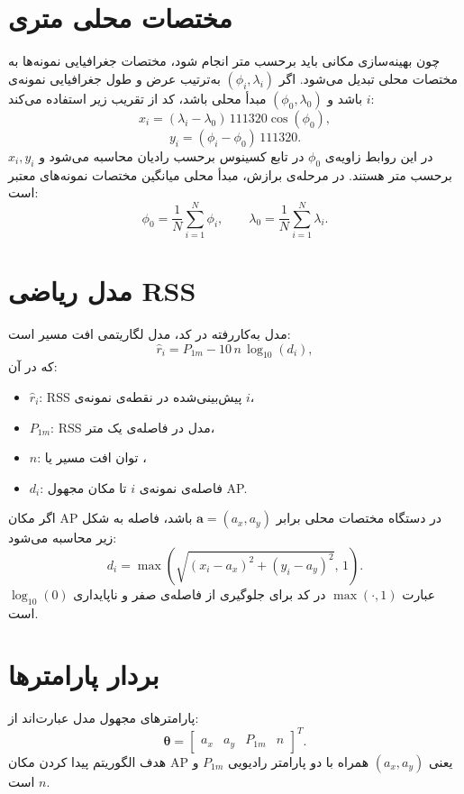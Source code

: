 \documentclass[12pt,a4paper]{article}
\begin{document}
\section{مختصات محلی متری}
چون بهینه‌سازی مکانی باید برحسب متر انجام شود، مختصات جغرافیایی نمونه‌ها به مختصات محلی تبدیل می‌شود. اگر
\((\phi_i,\lambda_i)\)
به‌ترتیب عرض و طول جغرافیایی نمونه‌ی
\(i\)
باشد و
\((\phi_0,\lambda_0)\)
مبدأ محلی باشد، کد از تقریب زیر استفاده می‌کند:
\[
x_i=(\lambda_i-\lambda_0)\,111320\cos(\phi_0),
\]
\[
y_i=(\phi_i-\phi_0)\,111320.
\]
در این روابط زاویه‌ی
\(\phi_0\)
در تابع کسینوس برحسب رادیان محاسبه می‌شود و
\(x_i,y_i\)
برحسب متر هستند. در مرحله‌ی برازش، مبدأ محلی میانگین مختصات نمونه‌های معتبر است:
\[
\phi_0=\frac{1}{N}\sum_{i=1}^{N}\phi_i,\qquad
\lambda_0=\frac{1}{N}\sum_{i=1}^{N}\lambda_i.
\]

\section{مدل ریاضی RSS}
مدل به‌کاررفته در کد، مدل لگاریتمی افت مسیر است:
\[
\hat r_i = P_{1m} - 10\,n\,\log_{10}(d_i),
\]
که در آن:
\begin{itemize}
  \item \(\hat r_i\): RSS پیش‌بینی‌شده در نقطه‌ی نمونه‌ی \(i\)،
  \item \(P_{1m}\): RSS مدل در فاصله‌ی یک متر،
  \item \(n\): توان افت مسیر یا ،
  \item \(d_i\): فاصله‌ی نمونه‌ی \(i\) تا مکان مجهول AP.
\end{itemize}
اگر مکان AP در دستگاه مختصات محلی برابر
\(\mathbf{a}=(a_x,a_y)\)
باشد، فاصله به شکل زیر محاسبه می‌شود:
\[
d_i=\max\left(\sqrt{(x_i-a_x)^2+(y_i-a_y)^2},\,1\right).
\]
عبارت
\(\max(\cdot,1)\)
در کد برای جلوگیری از فاصله‌ی صفر و ناپایداری
\(\log_{10}(0)\)
است.

\section{بردار پارامترها}
پارامترهای مجهول مدل عبارت‌اند از:
\[
\boldsymbol{\theta} =
\begin{bmatrix}
a_x & a_y & P_{1m} & n
\end{bmatrix}^{T}.
\]
هدف الگوریتم پیدا کردن مکان AP یعنی
\((a_x,a_y)\)
همراه با دو پارامتر رادیویی
\(P_{1m}\)
و
\(n\)
است.
\end{document}
